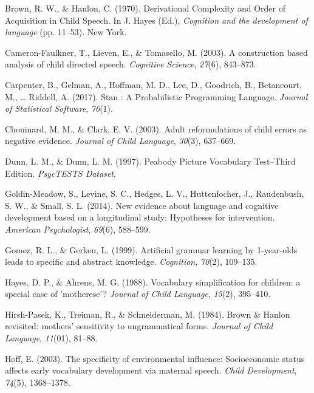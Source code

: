 \documentclass[10pt, letterpaper]{article}
\begin{document}
\hypertarget{refs}{}
\leavevmode\hypertarget{ref-Brown:1970wd}{}%
Brown, R. W., \& Hanlon, C. (1970). Derivational Complexity and Order of
Acquisition in Child Speech. In J. Hayes (Ed.), \emph{Cognition and the
development of language} (pp. 11--53). New York.

\leavevmode\hypertarget{ref-CameronFaulkner:2003ge}{}%
Cameron-Faulkner, T., Lieven, E., \& Tomasello, M. (2003). A
construction based analysis of child directed speech. \emph{Cognitive
Science}, \emph{27}(6), 843--873.

\leavevmode\hypertarget{ref-Carpenter:2017ke}{}%
Carpenter, B., Gelman, A., Hoffman, M. D., Lee, D., Goodrich, B.,
Betancourt, M., \ldots{} Riddell, A. (2017). Stan : A Probabilistic
Programming Language. \emph{Journal of Statistical Software},
\emph{76}(1).

\leavevmode\hypertarget{ref-Chouinard:2003kq}{}%
Chouinard, M. M., \& Clark, E. V. (2003). Adult reformulations of child
errors as negative evidence. \emph{Journal of Child Language},
\emph{30}(3), 637--669.

\leavevmode\hypertarget{ref-PeabodyPictureVoca:im}{}%
Dunn, L. M., \& Dunn, L. M. (1997). Peabody Picture Vocabulary
Test--Third Edition. \emph{PsycTESTS Dataset}.

\leavevmode\hypertarget{ref-GoldinMeadow:2014hr}{}%
Goldin-Meadow, S., Levine, S. C., Hedges, L. V., Huttenlocher, J.,
Raudenbush, S. W., \& Small, S. L. (2014). New evidence about language
and cognitive development based on a longitudinal study: Hypotheses for
intervention. \emph{American Psychologist}, \emph{69}(6), 588--599.

\leavevmode\hypertarget{ref-Gomez:1999bx}{}%
Gomez, R. L., \& Gerken, L. (1999). Artificial grammar learning by
1-year-olds leads to specific and abstract knowledge. \emph{Cognition},
\emph{70}(2), 109--135.

\leavevmode\hypertarget{ref-Hayes:1988ue}{}%
Hayes, D. P., \& Ahrens, M. G. (1988). Vocabulary simplification for
children: a special case of 'motherese'? \emph{Journal of Child
Language}, \emph{15}(2), 395--410.

\leavevmode\hypertarget{ref-HirshPasek:1984bd}{}%
Hirsh-Pasek, K., Treiman, R., \& Schneiderman, M. (1984). Brown \&
Hanlon revisited: mothers' sensitivity to ungrammatical forms.
\emph{Journal of Child Language}, \emph{11}(01), 81--88.

\leavevmode\hypertarget{ref-Hoff:2003kx}{}%
Hoff, E. (2003). The specificity of environmental influence:
Socioeconomic status affects early vocabulary development via maternal
speech. \emph{Child Development}, \emph{74}(5), 1368--1378.
\end{document}
